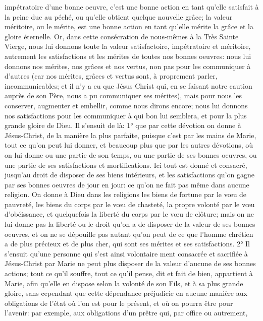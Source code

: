 impétratoire d'une bonne oeuvre, c'est une bonne action en tant qu'elle satisfait à la peine due au péché, ou qu'elle
obtient quelque nouvelle grâce; la valeur méritoire, ou le mérite, est une bonne action en tant qu'elle mérite la
grâce et la gloire éternelle. Or, dans cette consécration de nous-mêmes à la Très Sainte Vierge, nous lui donnons
toute la valeur satisfactoire, impétratoire et méritoire, autrement les satisfactions et les mérites de toutes nos
bonnes oeuvres: nous lui donnons nos mérites, nos grâces et nos vertus, non pas pour les communiquer à
d'autres (car nos mérites, grâces et vertus sont, à proprement parler, incommunicables; et il n'y a eu que Jésus Christ qui, en se faisant notre caution auprès de son Père, nous a pu communiquer ses mérites), mais pour nous
les conserver, augmenter et embellir, comme nous dirons encore; nous lui donnons nos satisfactions pour les
communiquer à qui bon lui semblera, et pour la plus grande gloire de Dieu.
 Il s'ensuit de là: 1° que par cette dévotion on donne à Jésus-Christ, de la manière la plus parfaite, puisque
c'est par les mains de Marie, tout ce qu'on peut lui donner, et beaucoup plus que par les autres dévotions, où on lui
donne ou une partie de son temps, ou une partie de ses bonnes oeuvres, ou une partie de ses satisfactions et
mortifications. Ici tout est donné et consacré, jusqu'au droit de disposer de ses biens intérieurs, et les satisfactions
qu'on gagne par ses bonnes oeuvres de jour en jour: ce qu'on ne fait pas même dans aucune religion. On donne à
Dieu dans les religions les biens de fortune par le vœu de pauvreté, les biens du corps par le vœu de chasteté, la
propre volonté par le vœu d'obéissance, et quelquefois la liberté du corps par le vœu de clôture; mais on ne lui
donne pas la liberté ou le droit qu'on a de disposer de la valeur de ses bonnes oeuvres, et on ne se dépouille pas
autant qu'on peut de ce que l'homme chrétien a de plus précieux et de plus cher, qui sont ses mérites et ses
satisfactions.
 2° Il s'ensuit qu'une personne qui s'est ainsi volontaire ment consacrée et sacrifiée à Jésus-Christ par Marie
ne peut plus disposer de la valeur d'aucune de ses bonnes actions; tout ce qu'il souffre, tout ce qu'il pense, dit et
fait de bien, appartient à Marie, afin qu'elle en dispose selon la volonté de son Fils, et à sa plus grande gloire, sans
cependant que cette dépendance préjudicie en aucune manière aux obligations de l'état où l'on est pour le
présent, et où on pourra être pour l'avenir: par exemple, aux obligations d'un prêtre qui, par office ou autrement,
